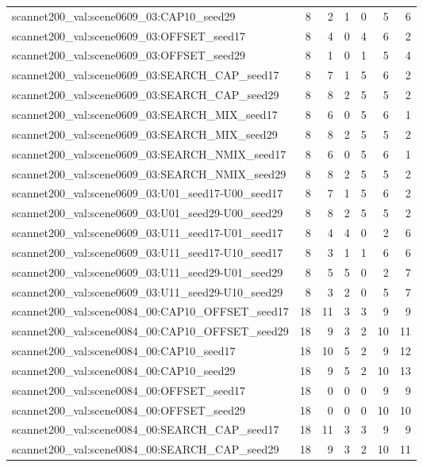 \begin{table}[t]
\begin{tabular}{lrrrrrr}
scannet200\_val:scene0609\_03:CAP10\_seed29 & 8 & 2 & 1 & 0 & 5 & 6 \\
scannet200\_val:scene0609\_03:OFFSET\_seed17 & 8 & 4 & 0 & 4 & 6 & 2 \\
scannet200\_val:scene0609\_03:OFFSET\_seed29 & 8 & 1 & 0 & 1 & 5 & 4 \\
scannet200\_val:scene0609\_03:SEARCH\_CAP\_seed17 & 8 & 7 & 1 & 5 & 6 & 2 \\
scannet200\_val:scene0609\_03:SEARCH\_CAP\_seed29 & 8 & 8 & 2 & 5 & 5 & 2 \\
scannet200\_val:scene0609\_03:SEARCH\_MIX\_seed17 & 8 & 6 & 0 & 5 & 6 & 1 \\
scannet200\_val:scene0609\_03:SEARCH\_MIX\_seed29 & 8 & 8 & 2 & 5 & 5 & 2 \\
scannet200\_val:scene0609\_03:SEARCH\_NMIX\_seed17 & 8 & 6 & 0 & 5 & 6 & 1 \\
scannet200\_val:scene0609\_03:SEARCH\_NMIX\_seed29 & 8 & 8 & 2 & 5 & 5 & 2 \\
scannet200\_val:scene0609\_03:U01\_seed17-U00\_seed17 & 8 & 7 & 1 & 5 & 6 & 2 \\
scannet200\_val:scene0609\_03:U01\_seed29-U00\_seed29 & 8 & 8 & 2 & 5 & 5 & 2 \\
scannet200\_val:scene0609\_03:U11\_seed17-U01\_seed17 & 8 & 4 & 4 & 0 & 2 & 6 \\
scannet200\_val:scene0609\_03:U11\_seed17-U10\_seed17 & 8 & 3 & 1 & 1 & 6 & 6 \\
scannet200\_val:scene0609\_03:U11\_seed29-U01\_seed29 & 8 & 5 & 5 & 0 & 2 & 7 \\
scannet200\_val:scene0609\_03:U11\_seed29-U10\_seed29 & 8 & 3 & 2 & 0 & 5 & 7 \\
scannet200\_val:scene0084\_00:CAP10\_OFFSET\_seed17 & 18 & 11 & 3 & 3 & 9 & 9 \\
scannet200\_val:scene0084\_00:CAP10\_OFFSET\_seed29 & 18 & 9 & 3 & 2 & 10 & 11 \\
scannet200\_val:scene0084\_00:CAP10\_seed17 & 18 & 10 & 5 & 2 & 9 & 12 \\
scannet200\_val:scene0084\_00:CAP10\_seed29 & 18 & 9 & 5 & 2 & 10 & 13 \\
scannet200\_val:scene0084\_00:OFFSET\_seed17 & 18 & 0 & 0 & 0 & 9 & 9 \\
scannet200\_val:scene0084\_00:OFFSET\_seed29 & 18 & 0 & 0 & 0 & 10 & 10 \\
scannet200\_val:scene0084\_00:SEARCH\_CAP\_seed17 & 18 & 11 & 3 & 3 & 9 & 9 \\
scannet200\_val:scene0084\_00:SEARCH\_CAP\_seed29 & 18 & 9 & 3 & 2 & 10 & 11 \\

\end{tabular}
\end{table}
